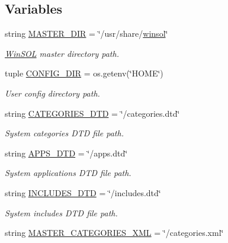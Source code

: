 \subsection*{Variables}
\begin{CompactItemize}
\item 
string \hyperlink{namespacewinsol_6681e9b2087addd71f66d08599352879}{MASTER\_\-DIR} = \char`\"{}/usr/share/\hyperlink{namespacewinsol_624e4bca2810b741068d3494a5a7612d}{winsol}\char`\"{}
\begin{CompactList}\small\item\em \hyperlink{classwinsol_1_1WinSOL}{Win\-SOL} master directory path. \item\end{CompactList}\item 
tuple \hyperlink{namespacewinsol_46eae7a0f9c136c5a878e4877cf346ad}{CONFIG\_\-DIR} = os.getenv(\char`\"{}HOME\char`\"{})
\begin{CompactList}\small\item\em User config directory path. \item\end{CompactList}\item 
string \hyperlink{namespacewinsol_75406b2652e6bf9dc6b9566a0cb0e517}{CATEGORIES\_\-DTD} = \char`\"{}/categories.dtd\char`\"{}
\begin{CompactList}\small\item\em System categories DTD file path. \item\end{CompactList}\item 
string \hyperlink{namespacewinsol_de0a178fcabafce978c245668b647015}{APPS\_\-DTD} = \char`\"{}/apps.dtd\char`\"{}
\begin{CompactList}\small\item\em System applications DTD file path. \item\end{CompactList}\item 
string \hyperlink{namespacewinsol_9a613f23f40b0893b5d130ccfc1a899e}{INCLUDES\_\-DTD} = \char`\"{}/includes.dtd\char`\"{}
\begin{CompactList}\small\item\em System includes DTD file path. \item\end{CompactList}\item 
string \hyperlink{namespacewinsol_3af9670786db792ef5991af5c3ae5793}{MASTER\_\-CATEGORIES\_\-XML} = \char`\"{}/categories.xml\char`\"{}

\end{CompactItemize}
